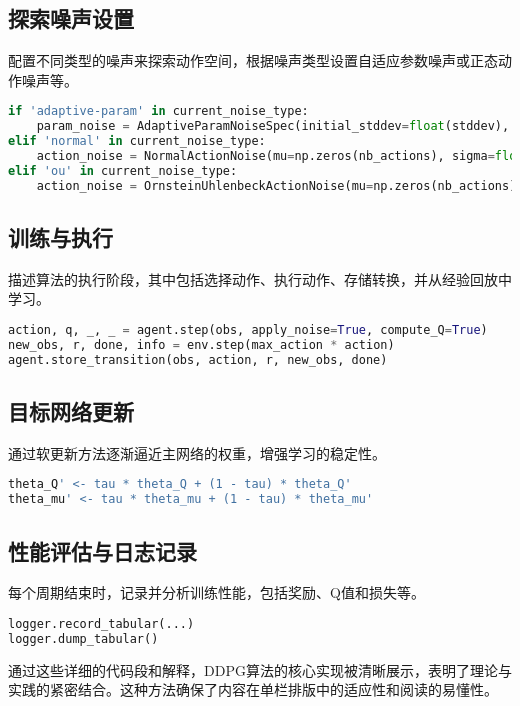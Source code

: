 \documentclass[twocolumn, 10pt]{article} %
\theoremstyle{remark}
\begin{document}
\subsection{探索噪声设置}
配置不同类型的噪声来探索动作空间，根据噪声类型设置自适应参数噪声或正态动作噪声等。
\begin{lstlisting}[language=Python, basicstyle=\small\ttfamily, breaklines=true]
if 'adaptive-param' in current_noise_type:
    param_noise = AdaptiveParamNoiseSpec(initial_stddev=float(stddev), desired_action_stddev=float(stddev))
elif 'normal' in current_noise_type:
    action_noise = NormalActionNoise(mu=np.zeros(nb_actions), sigma=float(stddev) * np.ones(nb_actions))
elif 'ou' in current_noise_type:
    action_noise = OrnsteinUhlenbeckActionNoise(mu=np.zeros(nb_actions), sigma=float(stddev) * np.ones(nb_actions))
\end{lstlisting}

\subsection{训练与执行}
描述算法的执行阶段，其中包括选择动作、执行动作、存储转换，并从经验回放中学习。
\begin{lstlisting}[language=Python, basicstyle=\small\ttfamily, breaklines=true]
action, q, _, _ = agent.step(obs, apply_noise=True, compute_Q=True)
new_obs, r, done, info = env.step(max_action * action)
agent.store_transition(obs, action, r, new_obs, done)
\end{lstlisting}

\subsection{目标网络更新}
通过软更新方法逐渐逼近主网络的权重，增强学习的稳定性。
\begin{lstlisting}[language=Python, basicstyle=\small\ttfamily, breaklines=true]
theta_Q' <- tau * theta_Q + (1 - tau) * theta_Q'
theta_mu' <- tau * theta_mu + (1 - tau) * theta_mu'
\end{lstlisting}

\subsection{性能评估与日志记录}
每个周期结束时，记录并分析训练性能，包括奖励、Q值和损失等。
\begin{lstlisting}[language=Python, basicstyle=\small\ttfamily, breaklines=true]
logger.record_tabular(...)
logger.dump_tabular()
\end{lstlisting}

通过这些详细的代码段和解释，DDPG算法的核心实现被清晰展示，表明了理论与实践的紧密结合。这种方法确保了内容在单栏排版中的适应性和阅读的易懂性。
\end{document}
